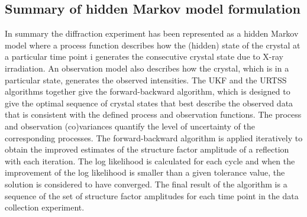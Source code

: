 \subsection{Summary of hidden Markov model formulation}
\label{sub:Summary of hidden Markov model formulation}
In summary the diffraction experiment has been represented as a hidden Markov model where a process function describes how the (hidden) state of the crystal at a particular time point i generates the consecutive crystal state due to X-ray irradiation.
An observation model also describes how the crystal, which is in a particular state, generates the observed intensities.
The UKF and the URTSS algorithms together give the forward-backward algorithm, which is designed to give the optimal sequence of crystal states that best describe the observed data that is consistent with the defined process and observation functions.
The process and observation (co)variances quantify the level of uncertainty of the corresponding processes.
The forward-backward algorithm is applied iteratively to obtain the improved estimates of the structure factor amplitude of a reflection with each iteration.
The log likelihood is calculated for each cycle and when the improvement of the log likelihood is smaller than a given tolerance value, the solution is considered to have converged.
The final result of the algorithm is a sequence of the set of structure factor amplitudes for each time point in the data collection experiment.
